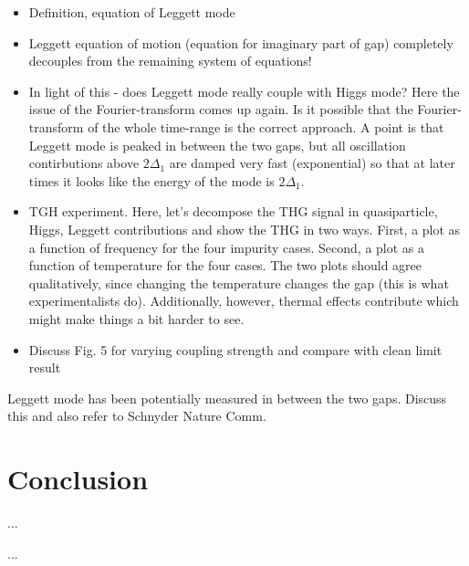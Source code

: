 \documentclass[aps,prb,reprint,noeprint,superscriptaddress]{revtex4-1}
\begin{document}
\begin{itemize}
	\item Definition, equation of Leggett mode
	\item Leggett equation of motion (equation for imaginary part of gap)
	  completely decouples from the remaining system of equations!
	\item In light of this - does Leggett mode really couple with Higgs
	  mode? Here the issue of the Fourier-transform comes up again. Is it
	  possible that the Fourier-transform of the whole time-range is the
	  correct approach. A point is that Leggett mode is peaked in between
	  the two gaps, but all oscillation contirbutions above $2\Delta_1$ are
	  damped very fast (exponential) so that at later times it looks like
	  the energy of the mode is $2\Delta_1$.
	\item TGH experiment. Here, let's decompose the THG signal in
	  quasiparticle, Higgs, Leggett contributions and show the THG in two
	  ways. First, a plot as a function of frequency for the four impurity
	  cases. Second, a plot as a function of temperature for the four cases.
	  The two plots should agree qualitatively, since changing the
	  temperature changes the gap (this is what experimentalists do).
	  Additionally, however, thermal effects contribute which might make
	  things a bit harder to see.
\end{itemize}


\begin{itemize}
	\item Discuss Fig. 5 for varying coupling strength and compare with clean limit result
\end{itemize}

Leggett mode has been potentially measured in between the two gaps. Discuss this
and also refer to Schnyder Nature Comm. 
 

\section{Conclusion}
\label{sec:conclusion}

...







\begin{acknowledgments}
...
\end{acknowledgments}
\end{document}
